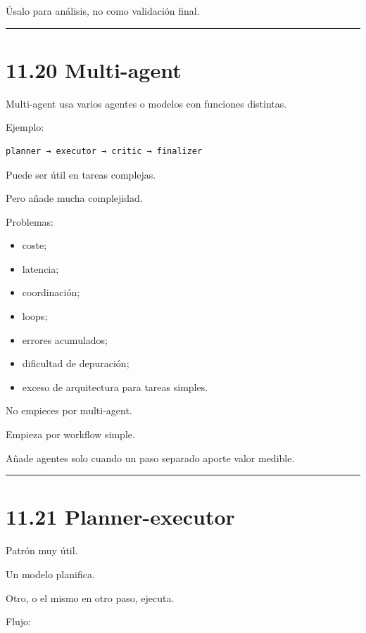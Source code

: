 Úsalo para análisis, no como validación final.

\begin{center}\rule{0.5\linewidth}{0.5pt}\end{center}

\section{11.20 Multi-agent}\label{multi-agent}

Multi-agent usa varios agentes o modelos con funciones distintas.

Ejemplo:

\begin{lstlisting}
planner → executor → critic → finalizer
\end{lstlisting}

Puede ser útil en tareas complejas.

Pero añade mucha complejidad.

Problemas:

\begin{itemize}
\tightlist
\item
  coste;
\item
  latencia;
\item
  coordinación;
\item
  loops;
\item
  errores acumulados;
\item
  dificultad de depuración;
\item
  exceso de arquitectura para tareas simples.
\end{itemize}

No empieces por multi-agent.

Empieza por workflow simple.

Añade agentes solo cuando un paso separado aporte valor medible.

\begin{center}\rule{0.5\linewidth}{0.5pt}\end{center}

\section{11.21 Planner-executor}\label{planner-executor}

Patrón muy útil.

Un modelo planifica.

Otro, o el mismo en otro paso, ejecuta.

Flujo:

